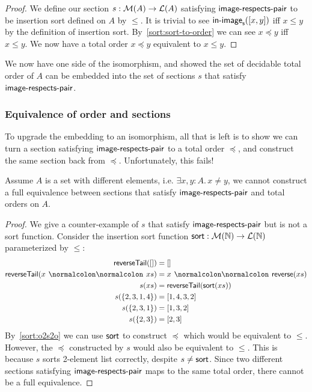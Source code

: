 \begin{proof}
    We define our section $s : \mathcal{M}(A) \to \mathcal{L}(A)$ satisfying $\operatorname{\mathsf{image-respects-pair}}$ to be
    insertion sort defined on $A$ by $\leq$.
    It is trivial to see $\operatorname{\mathsf{in-image}}_{\operatorname{\mathsf{s}}}([x, y])$ iff $x \leq y$ by the definition
    of insertion sort. By~\cref{sort:sort-to-order} we can see $x \preccurlyeq y$ iff $x \leq y$.
    We now have a total order $x \preccurlyeq y$ equivalent to $x \leq y$.
\end{proof}

We now have one side of the isomorphism, and showed the set of decidable total order of $A$
can be embedded into the set of sections $s$ that satisfy $\operatorname{\mathsf{image-respects-pair}}$.

\subsubsection{Equivalence of order and sections}
To upgrade the embedding to an isomorphism, all that is left
is to show we can turn a section satisfying $\operatorname{\mathsf{image-respects-pair}}$ to a total order $\preccurlyeq$, and construct the
same section back from $\preccurlyeq$. Unfortunately, this fails!

\begin{proposition}
    Assume $A$ is a set with different elements, i.e. $\exists x, y: A.\,x \neq y$,
    we cannot construct a full equivalence between sections that satisfy $\operatorname{\mathsf{image-respects-pair}}$
    and total orders on $A$.
\end{proposition}

\begin{proof}
    We give a counter-example of $s$ that satisfy $\operatorname{\mathsf{image-respects-pair}}$ but is not a sort function.
    Consider the insertion sort function $\operatorname{\mathsf{sort}} : \mathcal{M}(\mathbb{N}) \to \mathcal{L}(\mathbb{N})$
    parameterized by $\leq$:
    \begin{align*}
        \term{reverseTail}([])         & = []                                  \\
        \term{reverseTail}(x \cons xs) & = x \cons \term{reverse}(xs)          \\
        s(xs)                          & = \term{reverseTail}(\term{sort}(xs)) \\
        s(\{2,3,1,4\})                 & = [1,4,3,2]                           \\
        s(\{2,3,1\})                   & = [1, 3, 2]                           \\
        s(\{2,3\})                     & = [2, 3]                              \\
    \end{align*}
    By~\cref{sort:o2s2o} we can use $\operatorname{\mathsf{sort}}$ to construct $\preccurlyeq$ which would be
    equivalent to $\leq$. However, the $\preccurlyeq$ constructed by $s$ would also be equivalent
    to $\leq$. This is because $s$ sorts 2-element list correctly, despite $s \neq \operatorname{\mathsf{sort}}$.
    Since two different sections satisfying $\operatorname{\mathsf{image-respects-pair}}$ maps to the same total order,
    there cannot be a full equivalence.
\end{proof}


